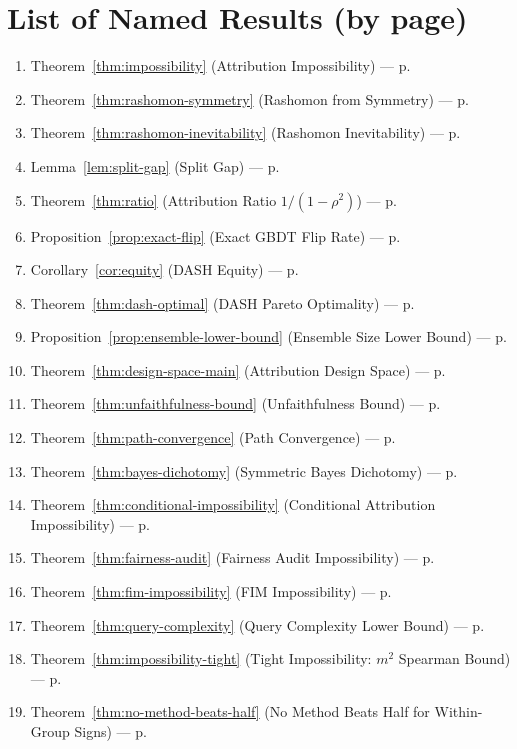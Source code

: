 \documentclass{article}
\begin{document}
\section*{List of Named Results (by page)}
\begin{enumerate}
\item Theorem~\ref{thm:impossibility} (Attribution Impossibility) --- p.\pageref{thm:impossibility}
\item Theorem~\ref{thm:rashomon-symmetry} (Rashomon from Symmetry) --- p.\pageref{thm:rashomon-symmetry}
\item Theorem~\ref{thm:rashomon-inevitability} (Rashomon Inevitability) --- p.\pageref{thm:rashomon-inevitability}
\item Lemma~\ref{lem:split-gap} (Split Gap) --- p.\pageref{lem:split-gap}
\item Theorem~\ref{thm:ratio} (Attribution Ratio $1/(1-\rho^2)$) --- p.\pageref{thm:ratio}
\item Proposition~\ref{prop:exact-flip} (Exact GBDT Flip Rate) --- p.\pageref{prop:exact-flip}
\item Corollary~\ref{cor:equity} (DASH Equity) --- p.\pageref{cor:equity}
\item Theorem~\ref{thm:dash-optimal} (DASH Pareto Optimality) --- p.\pageref{thm:dash-optimal}
\item Proposition~\ref{prop:ensemble-lower-bound} (Ensemble Size Lower Bound) --- p.\pageref{prop:ensemble-lower-bound}
\item Theorem~\ref{thm:design-space-main} (Attribution Design Space) --- p.\pageref{thm:design-space-main}
\item Theorem~\ref{thm:unfaithfulness-bound} (Unfaithfulness Bound) --- p.\pageref{thm:unfaithfulness-bound}
\item Theorem~\ref{thm:path-convergence} (Path Convergence) --- p.\pageref{thm:path-convergence}
\item Theorem~\ref{thm:bayes-dichotomy} (Symmetric Bayes Dichotomy) --- p.\pageref{thm:bayes-dichotomy}
\item Theorem~\ref{thm:conditional-impossibility} (Conditional Attribution Impossibility) --- p.\pageref{thm:conditional-impossibility}
\item Theorem~\ref{thm:fairness-audit} (Fairness Audit Impossibility) --- p.\pageref{thm:fairness-audit}
\item Theorem~\ref{thm:fim-impossibility} (FIM Impossibility) --- p.\pageref{thm:fim-impossibility}
\item Theorem~\ref{thm:query-complexity} (Query Complexity Lower Bound) --- p.\pageref{thm:query-complexity}
\item Theorem~\ref{thm:impossibility-tight} (Tight Impossibility: $m^2$ Spearman Bound) --- p.\pageref{thm:impossibility-tight}
\item Theorem~\ref{thm:no-method-beats-half} (No Method Beats Half for Within-Group Signs) --- p.\pageref{thm:no-method-beats-half}
\end{enumerate}
\end{document}
